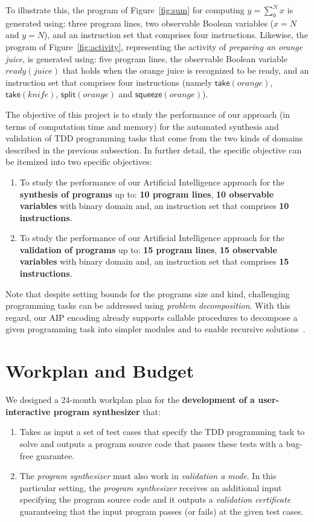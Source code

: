 \documentclass[10pt,a4paper]{paper}
\begin{document}
To illustrate this, the program of Figure~\ref{fig:sum} for computing $y = \sum_0^N x$ is generated using: three program lines, two observable Boolean variables ($x=N$ and $y=N$), and an instruction set that comprises four instructions. Likewise, the program of Figure~\ref{fig:activity}, representing the activity of {\em preparing an orange juice}, is generated using: five program lines, the observable Boolean variable $ready(juice)$ that holds when the orange juice is recognized to be ready, and an instruction set that comprises four instructions (namely $\mathsf{take}(orange)$, $\mathsf{take}(knife)$, $\mathsf{split}(orange)$ and $\mathsf{squeeze}(orange)$).

The objective of this project is to study the performance of our approach (in terms of computation time and memory) for the automated synthesis and validation of TDD programming tasks that come from the two kinds of domains described in the previous subsection. In further detail, the specific objective can be itemized into two specific objectives:
\begin{enumerate}
\item To study the performance of our Artificial Intelligence approach for the {\bf synthesis of programs} up to: {\bf 10 program lines}, {\bf 10 observable variables} with binary domain and, an instruction set that comprises {\bf 10 instructions}. 
\item To study the performance of our Artificial Intelligence approach for the {\bf validation of programs} up to: {\bf 15 program lines}, {\bf 15 observable variables} with binary domain and, an instruction set that comprises {\bf 15 instructions}. 
\end{enumerate}

Note that despite setting bounds for the programs size and kind, challenging programming tasks can be addressed using {\em problem decomposition}. With this regard, our AIP encoding already supports callable procedures to decompose a given programming task into simpler modules and to enable recursive solutions~\cite{sergio:aprograming:icaps16,sergio:aprograming:ijcai16,segovia:FSC:JAIR2018,segovia:programs:AIJ19}.



\section{Workplan and Budget}
\label{sec:workplan}

We designed a 24-month workplan plan for the {\bf development of a user-interactive program synthesizer} that:
\begin{enumerate}
\item Takes as input a set of test cases that specify the TDD programming task to solve and outputs a program source code that passes these tests with a bug-free guarantee.
\item The {\em program synthesizer} must also work in {\em validation a mode}. In this particular setting, the {\em program synthesizer} receives an additional input specifying the program source code and it outputs a {\em validation certificate} guaranteeing that the input program passes (or fails) at the given test cases. 
\end{enumerate}
\end{document}

